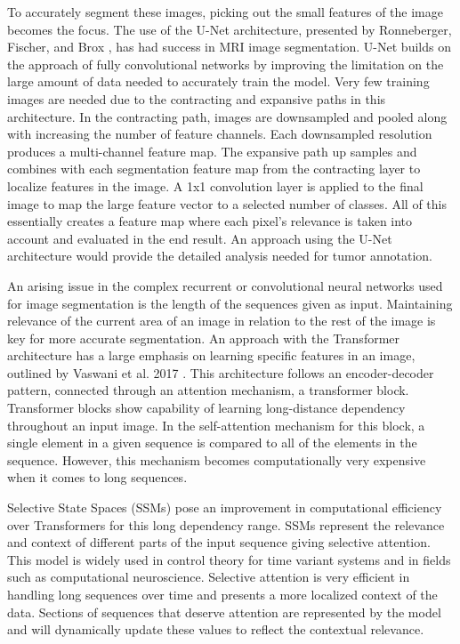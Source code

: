 \documentclass[conference]{IEEEtran}
\begin{document}
To accurately segment these images, picking out the small features of the image becomes the focus. The use of the U-Net architecture, presented by Ronneberger, Fischer, and Brox \cite{ronneberger2015unet}, has had success in MRI image segmentation. U-Net builds on the approach of fully convolutional networks by improving the limitation on the large amount of data needed to accurately train the model. Very few training images are needed due to the contracting and expansive paths in this architecture. In the contracting path, images are downsampled and pooled along with increasing the number of feature channels. Each downsampled resolution produces a multi-channel feature map. The expansive path up samples and combines with each segmentation feature map from the contracting layer to localize features in the image. A 1x1 convolution layer is applied to the final image to map the large feature vector to a selected number of classes. All of this essentially creates a feature map where each pixel’s relevance is taken into account and evaluated in the end result. An approach using the U-Net architecture would provide the detailed analysis needed for tumor annotation. 

An arising issue in the complex recurrent or convolutional neural networks used for image segmentation is the length of the sequences given as input. Maintaining relevance of the current area of an image in relation to the rest of the image is key for more accurate segmentation. An approach with the Transformer architecture has a large emphasis on learning specific features in an image, outlined by Vaswani et al. 2017 \cite{vaswani2023attention}. This architecture follows an encoder-decoder pattern, connected through an attention mechanism, a transformer block. Transformer blocks show capability of learning long-distance dependency throughout an input image. In the self-attention mechanism for this block, a single element in a given sequence is compared to all of the elements in the sequence. However, this mechanism becomes computationally very expensive when it comes to long sequences.
	
Selective State Spaces (SSMs) pose an improvement in computational efficiency over Transformers for this long dependency range. SSMs represent the relevance and context of different parts of the input sequence giving selective attention. This model is widely used in control theory for time variant systems and in fields such as computational neuroscience. Selective attention is very efficient in handling long sequences over time and presents a more localized context of the data. Sections of sequences that deserve attention are represented by the model and will dynamically update these values to reflect the contextual relevance. 
	
\end{document}
